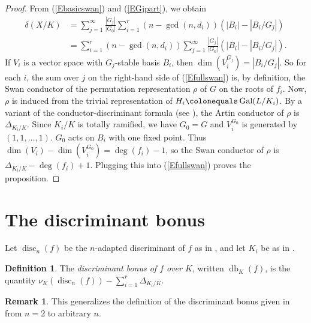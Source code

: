 \documentclass[12pt]{amsart}
\numberwithin{equation}{section}
\theoremstyle{definition}
\newtheorem{remark}[equation]{Remark}
\newtheorem{defn}[equation]{Definition}
\newcommand{\ol}[1]{\overline{#1}}
\DeclareMathOperator{\Gal}{Gal}
\DeclareMathOperator{\disc}{disc}
\DeclareMathOperator{\db}{db}
\begin{document}
\begin{proof}
From (\ref{Ebasicswan}) and (\ref{EGjpart}), we obtain
\begin{equation}\label{Efullswan}
\begin{aligned}
    \delta(X/K) &= \sum_{j=1}^{\infty} \frac{|G_j|}{|G_0|} \sum_{i =1}^r (n- \gcd(n, d_i))(|B_i| -
    |B_i/G_j|) \\
    &= \sum_{i=1}^r (n - \gcd(n, d_i)) \sum_{j=1}^{\infty}\frac{|G_j|}{|G_0|}  (|B_i| - |B_i/G_j|).
\end{aligned}
\end{equation}
If $V_i$ is a vector space with $G_j$-stable basis $B_i$, then $\dim(V_i^{G_j}) =
|B_i/G_j|$.  So for each $i$, the sum over $j$ on the right-hand side of
(\ref{Efullswan}) is, by definition, the Swan conductor of the permutation
representation $\rho$ of $G$ on the roots of $f_i$.  Now, $\rho$ is induced from the
trivial representation of $H_i \colonequals \Gal(L/K_i)$.  By a variant of the
conductor-discriminant formula (see \cite[p.\ 101, Corollary to
Proposition 4]{SerreLF}), the Artin conductor of $\rho$
is $\Delta_{K_i/K}$. Since $K_i/K$ is totally ramified, we have $G_0 =
G$ and $V_i^{G_0}$ is generated by $(1, 1, \ldots, 1)$.
$G_0$ acts on $B_i$ with one fixed point.  Thus $\dim(V_i) - \dim(V_i^{G_0}) =
\deg(f_i) - 1$, so the Swan
conductor of $\rho$ is $\Delta_{K_i/K} - \deg(f_i) + 1$.  Plugging
this into (\ref{Efullswan}) proves the proposition.
\end{proof}




\section{The discriminant  bonus}\label{Sdb} 



Let $\disc_n(f)$ be the $n$-adapted discriminant of $f$ as in , and let $K_i$ be as in .
\begin{defn}\label{Ddiscbonus}
The \emph{discriminant bonus of $f$ over $K$}, written $\db_K(f)$, is the
quantity $\nu_K(\disc_n(f)) - \sum_{i=1}^r \Delta_{K_i/K}$.
\end{defn}

\begin{remark}
 This generalizes the definition of the discriminant bonus given in \cite[Definition~2.4]{OShyper_published} from $n=2$ to arbitrary $n$.
\end{remark}
\end{document}
